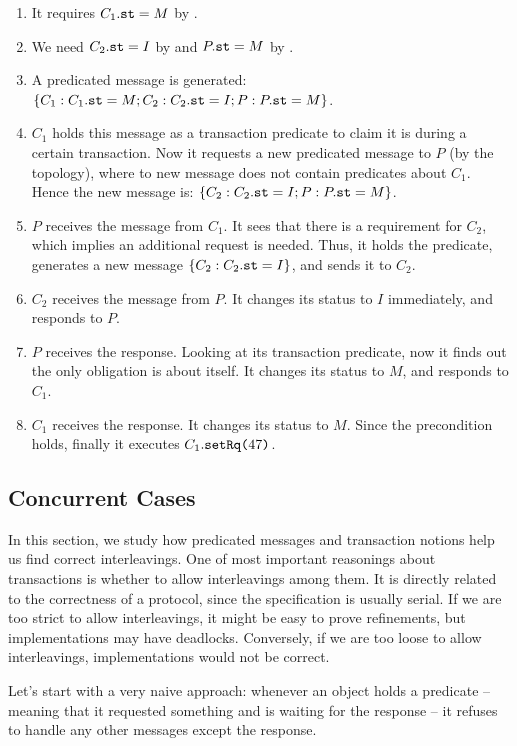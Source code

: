 \documentclass[format=manuscript]{acmart}
\begin{document}
\begin{enumerate}
\item It requires $C_1.\texttt{st} = M$ by .
\item We need $C_2.\texttt{st} = I$ by  and $P.\texttt{st} = M$ by
  .
\item A predicated message is generated: $\{ C_1: C_1.\texttt{st} = M; C_2:
  C_2.\texttt{st} = I; P: P.\texttt{st} = M \}$.
\item $C_1$ holds this message as a transaction predicate to claim it is during
  a certain transaction. Now it requests a new predicated message to $P$ (by the
  topology), where to new message does not contain predicates about $C_1$.
  Hence the new message is: $\{ C_2: C_2.\texttt{st} = I; P: P.\texttt{st} = M \}$.
\item $P$ receives the message from $C_1$. It sees that there is a requirement
  for $C_2$, which implies an additional request is needed. Thus, it holds the
  predicate, generates a new message $\{ C_2: C_2.\texttt{st} = I \}$, and sends it
  to $C_2$.
\item $C_2$ receives the message from $P$. It changes its status to $I$
  immediately, and responds to $P$.
\item $P$ receives the response. Looking at its transaction predicate, now it
  finds out the only obligation is about itself. It changes its status to $M$,
  and responds to $C_1$.
\item $C_1$ receives the response. It changes its status to $M$. Since the
  precondition holds, finally it executes $C_1.\texttt{setRq(}47\texttt{)}$.
\end{enumerate}

\subsection{Concurrent Cases}\label{concurrent-cases}

In this section, we study how predicated messages and transaction notions help
us find correct interleavings. One of most important reasonings about
transactions is whether to allow interleavings among them. It is directly
related to the correctness of a protocol, since the specification is usually
serial. If we are too strict to allow interleavings, it might be easy to prove
refinements, but implementations may have deadlocks. Conversely, if we are too
loose to allow interleavings, implementations would not be correct.

Let's start with a very naive approach: whenever an object holds a predicate --
meaning that it requested something and is waiting for the response -- it
refuses to handle any other messages except the response.
\end{document}
